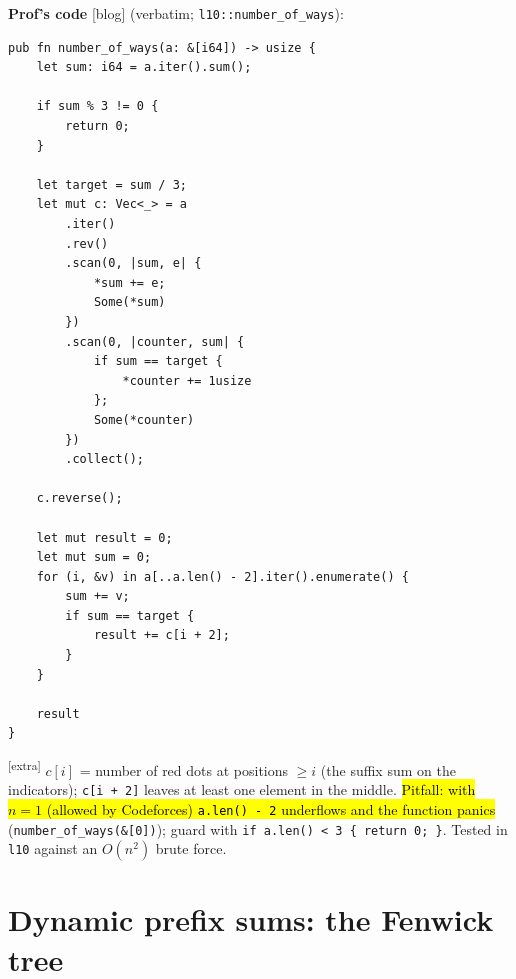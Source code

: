\documentclass[11pt,a4paper]{article}
\theoremstyle{definition}\newtheorem*{definition}{Definition}
\newcommand{\hlp}[1]{{\sethlcolor{hlP}\hl{#1}}}
\newcommand{\extra}{\textsuperscript{\textcolor{warn}{[extra]}}}
\begin{document}
\noindent\textbf{Prof's code} [blog] (verbatim; \texttt{l10::number\_of\_ways}):
\begin{lstlisting}
pub fn number_of_ways(a: &[i64]) -> usize {
    let sum: i64 = a.iter().sum();

    if sum % 3 != 0 {
        return 0;
    }

    let target = sum / 3;
    let mut c: Vec<_> = a
        .iter()
        .rev()
        .scan(0, |sum, e| {
            *sum += e;
            Some(*sum)
        })
        .scan(0, |counter, sum| {
            if sum == target {
                *counter += 1usize
            };
            Some(*counter)
        })
        .collect();

    c.reverse();

    let mut result = 0;
    let mut sum = 0;
    for (i, &v) in a[..a.len() - 2].iter().enumerate() {
        sum += v;
        if sum == target {
            result += c[i + 2];
        }
    }

    result
}
\end{lstlisting}
\noindent\extra{} $c[i]$ = number of red dots at positions $\ge i$ (the suffix sum on the indicators); \texttt{c[i + 2]} leaves at least one element in the middle.
\hlp{Pitfall: with \mbox{$n=1$} (allowed by Codeforces) \texttt{a.len() - 2} underflows and the function panics} (\texttt{number\_of\_ways(\&[0])}); guard with
\texttt{if a.len() < 3 \{ return 0; \}}. Tested in \texttt{l10} against an $O(n^2)$ brute force.

\section{Dynamic prefix sums: the Fenwick tree}\label{sec:fenwick}
\end{document}
